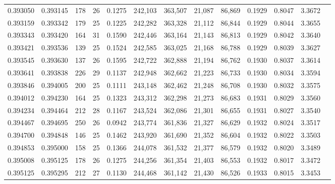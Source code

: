 \begin{tabular}{rrrrrrrrrrrrr}
0.393050 & 0.393145 &   178 &  26 &                                     0.1275 & 242,103 & 363,507 &  21,087 &  86,869 & 0.1929 & 0.8047 & 3.3672 \\
0.393159 & 0.393342 &   179 &  25 &                                     0.1225 & 242,282 & 363,328 &  21,112 &  86,844 & 0.1929 & 0.8044 & 3.3655 \\
0.393343 & 0.393420 &   164 &  31 &                                     0.1590 & 242,446 & 363,164 &  21,143 &  86,813 & 0.1929 & 0.8042 & 3.3640 \\
0.393421 & 0.393536 &   139 &  25 &                                     0.1524 & 242,585 & 363,025 &  21,168 &  86,788 & 0.1929 & 0.8039 & 3.3627 \\
0.393545 & 0.393630 &   137 &  26 &                                     0.1595 & 242,722 & 362,888 &  21,194 &  86,762 & 0.1930 & 0.8037 & 3.3614 \\
0.393641 & 0.393838 &   226 &  29 &                                     0.1137 & 242,948 & 362,662 &  21,223 &  86,733 & 0.1930 & 0.8034 & 3.3594 \\
0.393846 & 0.394005 &   200 &  25 &                                     0.1111 & 243,148 & 362,462 &  21,248 &  86,708 & 0.1930 & 0.8032 & 3.3575 \\
0.394012 & 0.394230 &   164 &  25 &                                     0.1323 & 243,312 & 362,298 &  21,273 &  86,683 & 0.1931 & 0.8029 & 3.3560 \\
0.394234 & 0.394464 &   212 &  28 &                                     0.1167 & 243,524 & 362,086 &  21,301 &  86,655 & 0.1931 & 0.8027 & 3.3540 \\
0.394467 & 0.394695 &   250 &  26 &                                     0.0942 & 243,774 & 361,836 &  21,327 &  86,629 & 0.1932 & 0.8024 & 3.3517 \\
0.394700 & 0.394848 &   146 &  25 &                                     0.1462 & 243,920 & 361,690 &  21,352 &  86,604 & 0.1932 & 0.8022 & 3.3503 \\
0.394853 & 0.395000 &   158 &  25 &                                     0.1366 & 244,078 & 361,532 &  21,377 &  86,579 & 0.1932 & 0.8020 & 3.3489 \\
0.395008 & 0.395125 &   178 &  26 &                                     0.1275 & 244,256 & 361,354 &  21,403 &  86,553 & 0.1932 & 0.8017 & 3.3472 \\
0.395125 & 0.395295 &   212 &  27 &                                     0.1130 & 244,468 & 361,142 &  21,430 &  86,526 & 0.1933 & 0.8015 & 3.3453 \\

\end{tabular}
